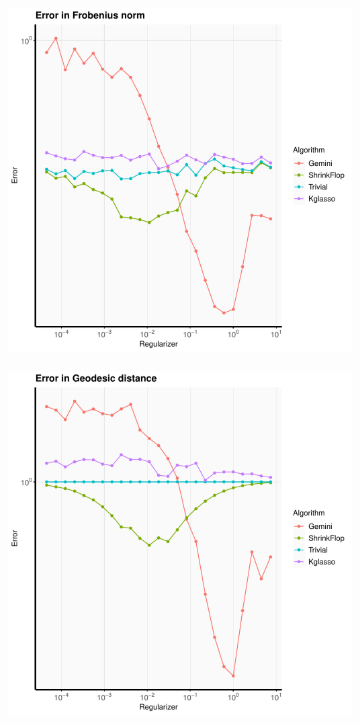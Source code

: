 \documentclass[aos]{imsart}
\theoremstyle{definition}
\numberwithin{equation}{section}
\begin{document}
\begin{figure}
              \centering
              \begin{subfigure}[b]{.4\textwidth}
         \includegraphics[width=\textwidth]{./code/zhou-comparison/25-50-doubly-sparse-frob.pdf}
         \end{subfigure}
         \begin{subfigure}[b]{.4\textwidth}
         \includegraphics[width=\textwidth]{./code/zhou-comparison/25-50-doubly-sparse-geo.pdf}

\end{subfigure}
\end{figure}
\end{document}

